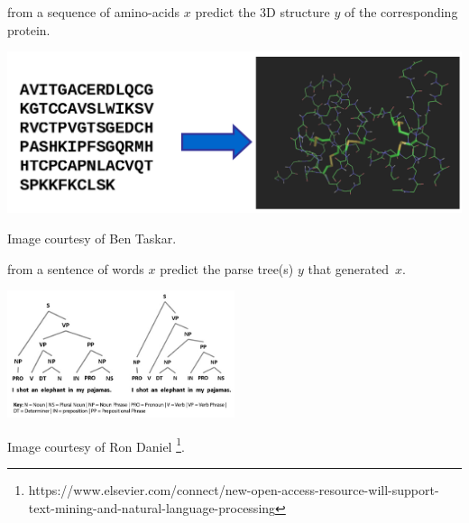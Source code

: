 \begin{appendix}
\begin{example}
from a sequence of amino-acids $x$ predict the 3D structure $y$ of the
corresponding protein.

  \centering
    \includegraphics[scale=0.4]{img/proteinfolding}
    
Image courtesy of Ben Taskar.
\end{example}

\begin{example}
from a sentence of words $x$ predict the parse tree(s) $y$ that generated~$x$.

  \centering
    \includegraphics[width=0.5\textwidth]{img/parsetree}
    
Image courtesy of Ron
Daniel%
\footnote{https://www.elsevier.com/connect/new-open-access-resource-will-support-text-mining-and-natural-language-processing}.
\end{example}
\end{appendix}



